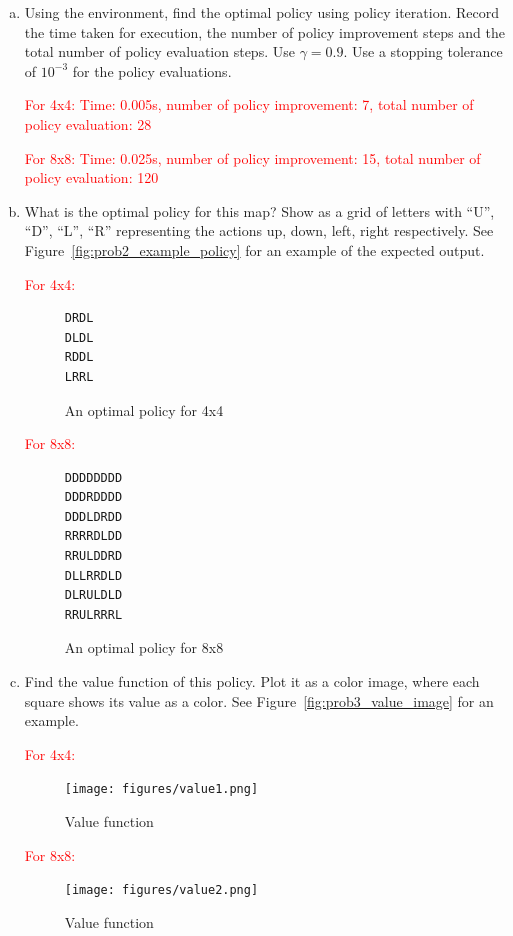 \documentclass[12pt]{article}
\newcommand{\yl}[1]{\textcolor{red}{#1}}
\begin{document}
\begin{enumerate}[a)]
\item Using the environment, find the optimal policy using policy
  iteration. Record the time taken for execution, the number of policy
  improvement steps and the total number of policy evaluation
  steps. Use $\gamma=0.9$. Use a stopping tolerance of
  $10^{-3}$ for the policy evaluations.
   
  \yl{For 4x4: Time: 0.005s, number of policy improvement: 7, total number of policy evaluation: 28}
  
  \yl{For 8x8: Time: 0.025s, number of policy improvement: 15, total number of policy evaluation: 120}
\item What is the optimal policy for this map? Show as a grid of
  letters with ``U'', ``D'', ``L'', ``R'' representing the actions up,
  down, left, right respectively. See
  Figure~\ref{fig:prob2_example_policy} for an example of the expected
  output.  
  
  \yl{For 4x4:}
  \begin{figure}[H]
  \centering
  \begin{BVerbatim}
DRDL
DLDL
RDDL
LRRL
  \end{BVerbatim}
  \caption{An optimal policy for 4x4}
\end{figure}

  \yl{For 8x8:}
  \begin{figure}[H]
  \centering
  \begin{BVerbatim}
DDDDDDDD
DDDRDDDD
DDDLDRDD
RRRRDLDD
RRULDDRD
DLLRRDLD
DLRULDLD
RRULRRRL
  \end{BVerbatim}
  \caption{An optimal policy for 8x8}
\end{figure}
\item Find the value function of this policy. Plot it as a color
  image, where each square shows its value as a color. See
  Figure~\ref{fig:prob3_value_image} for an example.
  
  \yl{For 4x4:}
  
  \begin{figure}[H]
  \centering
  \texttt{[image: figures/value1.png]}
  \caption{Value function}
\end{figure}

  \yl{For 8x8:}
  
  \begin{figure}[H]
  \centering
  \texttt{[image: figures/value2.png]}
  \caption{Value function}
\end{figure}
 

\end{enumerate}
\end{document}

